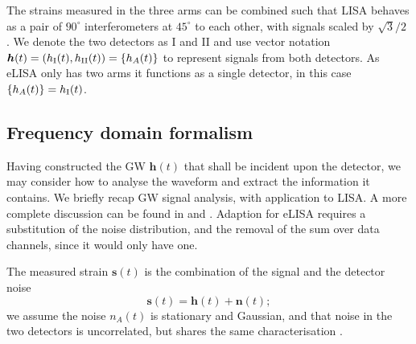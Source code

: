 The strains measured in the three arms can be combined such that LISA behaves as a pair of $90^{\circ}$ interferometers at $45^{\circ}$ to each other, with signals scaled by ${\sqrt{3}}/{2}$ \citep{Cutler1998}. We denote the two detectors as I and II and use vector notation $\boldsymbol{h}(t) = \left(h_\mathrm{I}(t), h_\mathrm{II}(t)\right) = \left\{h_A(t)\right\}$ to represent signals from both detectors. As eLISA only has two arms it functions as a single detector, in this case $\left\{h_A(t)\right\} = h_\mathrm{I}(t)$.

\subsection{Frequency domain formalism}

Having constructed the GW $\boldsymbol{h}(t)$ that shall be incident upon the detector, we may consider how to analyse the waveform and extract the information it contains. We briefly recap GW signal analysis, with application to LISA. A more complete discussion can be found in \citet{Finn1992} and \citet{Cutler1994}. Adaption for eLISA requires a substitution of the noise distribution, and the removal of the sum over data channels, since it would only have one.

The measured strain $\boldsymbol{s}(t)$ is the combination of the signal and the detector noise
\begin{equation}
\boldsymbol{s}(t) = \boldsymbol{h}(t) + \boldsymbol{n}(t);
\end{equation}
we assume the noise $n_A(t)$ is stationary and Gaussian, and that noise in the two detectors is uncorrelated, but shares the same characterisation \citep{Cutler1998}.

